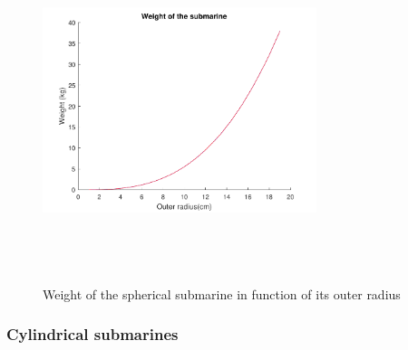 \begin{figure}[htb]
\centering
\includegraphics[width=8cm, height=10cm, clip]{figures/Paul/SphereWeight.pdf}
\caption{Weight of the spherical submarine in function of its outer radius}
\label{sphereweight}
\end{figure}



\subsubsection{Cylindrical submarines}